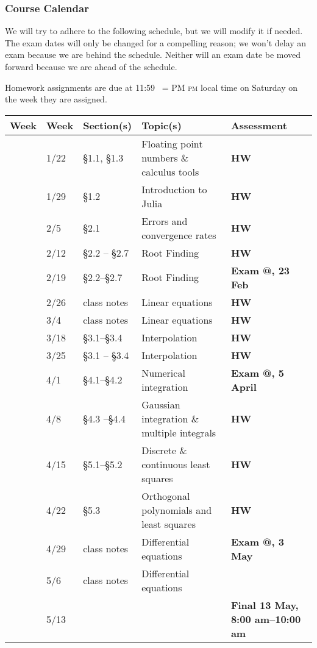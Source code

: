 \documentclass[12pt]{article}
\makeatletter
\newcounter{hw}\setcounter{hw}{0}
\newcommand{\hw}{%
\setcounter{hw}{\value{hw}+1}
\textbf{HW \thehw}}
\newcommand*{\rom}[1]{\expandafter\@slowromancap\romannumeral #1@}
\newcounter{ex}\setcounter{ex}{0}
\newcommand{\ex}{%
\setcounter{ex}{\value{ex}+1}
Exam \rom{\theex}}
\newcounter{wk}\setcounter{wk}{0}
\newcommand{\wk}{%
\setcounter{wk}{\value{wk}+1}
\thewk \,\,}
\DeclareRobustCommand{\maybefakesc}[1]{%
  \ifnum\pdfstrcmp{\f@series}{\bfdefault}=\z@
    {\fontsize{\dimexpr0.8\dimexpr\f@size pt\relax}{0}\selectfont\uppercase{#1}}%
  \else
    \textsc{#1}%
  \fi
}
\newcommand\PM{\,\maybefakesc{pm}\xspace}
\makeatother
\begin{document}
\subsubsection*{Course Calendar}

We will try to adhere to the following schedule, but we will modify it
if needed. The exam dates will only be changed for a compelling
reason; we won't delay an exam because we are behind the
schedule. Neither will an exam date be moved forward because we are
ahead of the schedule.

Homework assignments are due at 11:59 \PM local time on Saturday on the week they are assigned. 

\vspace{0.1in}

\begin{center}

\begin{tabular}  {|l|l|l|l|l|}
\hline
{\bf Week}  & {\bf Week} &  {\bf Section(s)} & {\bf Topic(s)} & {\bf Assessment} \\
\hline \hline 
\wk    & 1/22 & \S1.1, \S1.3      &  Floating point numbers \& calculus tools  &  \hw  \\
\wk    & 1/29 &    \S1.2   &   Introduction to Julia  & \hw \\
\wk    & 2/5 &    \S2.1 & Errors and convergence rates    & \hw \\
\wk    & 2/12  & \S2.2 -- \S2.7 &  Root Finding   &  \hw \\
\wk    & 2/19 &  \S2.2--\S2.7   &  Root Finding    &  \textbf{\ex, 23 Feb}   \\
\wk    & 2/26 &  class notes                    &    Linear equations                    &    \hw                                  \\
\wk    & 3/4   &  class notes     &  Linear equations  &   \hw    \\
\wk    & 3/18     & \S3.1--\S3.4 & Interpolation &  \hw   \\
\wk   & 3/25   & \S3.1 -- \S3.4   &   Interpolation   & \hw \\
\wk  &  4/1   & \S4.1--\S4.2 &  Numerical  integration  & \textbf{\ex , 5 April}  \\
\wk &  4/8    &   \S4.3 --\S4.4 &   Gaussian integration \& multiple integrals   &  \hw  \\
\wk  & 4/15 &   \S5.1--\S5.2 & Discrete \& continuous least squares  &  \hw  \\
\wk   & 4/22  & \S5.3 &  Orthogonal polynomials and least squares  & \hw  \\
\wk   & 4/29   &   class notes      & Differential equations &  \textbf{\ex, 3 May}     \\
\wk   & 5/6   &  class notes       & Differential equations   &  \\
\wk   & 5/13       &  &  &  \textbf{Final 13 May,  8:00 am--10:00 am} \\ \hline
\end{tabular}
\end{center}
\end{document}
